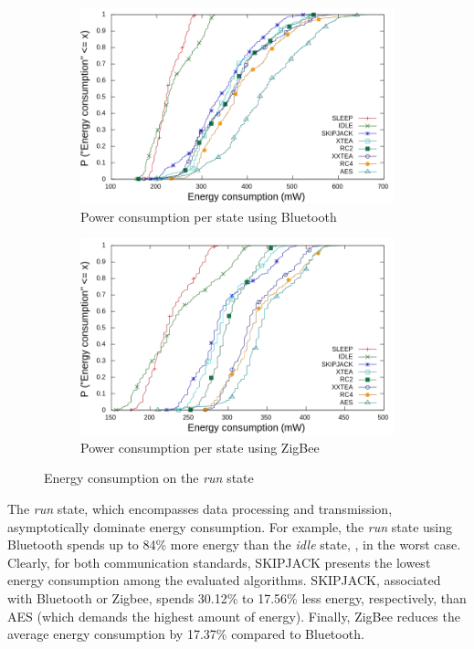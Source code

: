 \documentclass[journal]{IEEEtran}
\begin{document}
\begin{figure}[!t]
\centering
  \begin{subfigure}[b]{0.35\textwidth}
    \includegraphics[width=\textwidth]{Figures/cdf_blue_aes.png}
    \caption{Power consumption per state using Bluetooth}
    \label{fig:cdf_blue}
  \end{subfigure}
  \begin{subfigure}[b]{0.35\textwidth}
    \includegraphics[width=\textwidth]{Figures/cdf_zig_aes.png}
    \caption{Power consumption per state using ZigBee}
    \label{fig:cdf_zig}
  \end{subfigure}
  \vspace{-0.2cm}
  \caption{Energy consumption on the {\em run} state}
  \vspace{-0.45cm}
\end{figure}

The {\em run} state, which encompasses data processing and transmission, asymptotically dominate energy consumption. For example, the {\em run} state using Bluetooth spends up to 84\% more energy than the {\em idle} state, , in the worst case. Clearly, for both communication standards, SKIPJACK presents the lowest energy consumption among the evaluated algorithms. SKIPJACK, associated with Bluetooth or Zigbee, spends 30.12\% to 17.56\% less energy, respectively, than AES (which demands the highest amount of energy). Finally, ZigBee reduces the average energy consumption by 17.37\% compared to Bluetooth.
\end{document}
